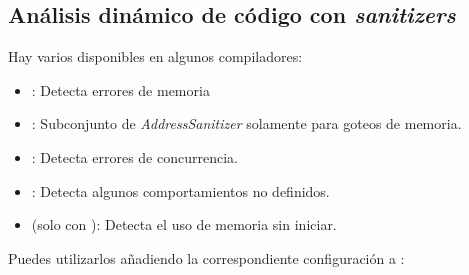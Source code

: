 \subsection{Análisis dinámico de código con \emph{sanitizers}}

Hay varios  disponibles en algunos compiladores:

\begin{itemize}
  \item {}: 
        Detecta errores de memoria
  \item {}: 
        Subconjunto de \emph{AddressSanitizer} solamente para goteos de memoria.
  \item {}: 
        Detecta errores de concurrencia.
  \item {}: 
        Detecta algunos comportamientos no definidos.
  \item {} (solo con ): 
        Detecta el uso de memoria sin iniciar.
\end{itemize}

Puedes utilizarlos añadiendo la correspondiente configuración a
:

